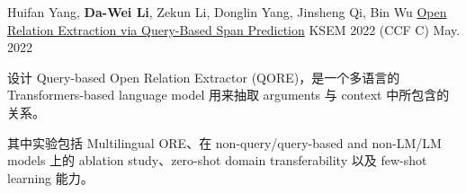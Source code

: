 \begin{cventries}
  \cventry
    {Huifan Yang, \textbf{Da-Wei Li}, Zekun Li, Donglin Yang, Jinsheng Qi, Bin Wu} %
    {\href{https://www.easychair.org/publications/preprint_open/lLmV}{Open Relation Extraction via Query-Based Span Prediction}} %
    {KSEM 2022 (CCF C)} %
    {May. 2022} %
    {
      \begin{cvitems} %
        \item {设计 Query-based Open Relation Extractor (QORE)，是一个多语言的 Transformers-based language model 用来抽取 arguments 与 context 中所包含的关系。}
        \item {其中实验包括 Multilingual ORE、在 non-query/query-based and non-LM/LM models 上的 ablation study、zero-shot domain transferability 以及 few-shot learning 能力。}
      \end{cvitems}
    }

\end{cventries}
